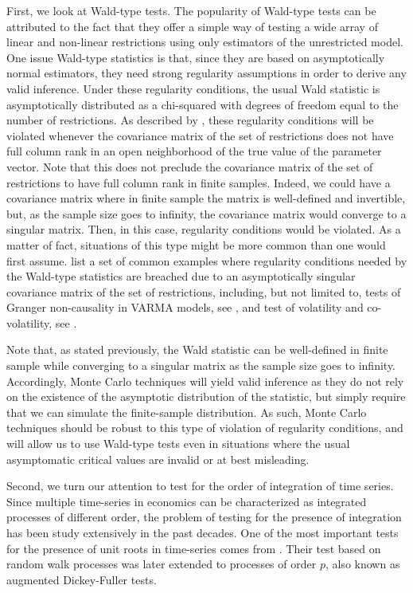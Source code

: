 \documentclass[]{article}\usepackage[]{graphicx}\usepackage[]{color}
\begin{document}
First, we look at Wald-type tests. The popularity of Wald-type tests can be attributed to the fact that they offer a simple way of testing a wide array of linear and non-linear restrictions using only estimators of the unrestricted model. One issue Wald-type statistics is that, since they are based on asymptotically normal estimators, they need strong regularity assumptions in order to derive any valid inference. Under these regularity conditions, the usual Wald statistic is asymptotically distributed as a chi-squared with degrees of freedom equal to the number of restrictions. As described by \cite{dufour_wald_2013}, these regularity conditions will be violated whenever the covariance matrix of the set of restrictions does not have full column rank in an open neighborhood of the true value of the parameter vector. Note that this does not preclude the  covariance matrix of the set of restrictions to have full column rank in finite samples. Indeed, we could have a covariance matrix where in finite sample the matrix is well-defined and invertible, but, as the sample size goes to infinity, the covariance matrix would converge to a singular matrix. Then, in this case, regularity conditions would be violated. As a matter of fact, situations of this type might be more common than one would first assume. \cite{dufour_wald_2013} list a set of common examples where regularity conditions needed by the Wald-type statistics are breached due to an asymptotically singular covariance matrix of the set of restrictions, including, but not limited to, tests of Granger non-causality in VARMA models, see \cite{boudjellaba_testing_1992, boudjellaba_simplified_1992}, and test of volatility and co-volatility, see \cite{gourieroux_size_2013}.

Note that, as stated previously, the Wald statistic can be well-defined in finite sample while converging to a singular matrix as the sample size goes to infinity. Accordingly, Monte Carlo techniques will yield valid inference as they do not rely on the existence of the asymptotic distribution of the statistic, but simply require that we can simulate the finite-sample distribution. As such, Monte Carlo techniques should be robust to this type of violation of regularity conditions, and will allow us to use Wald-type tests even in situations where the usual asymptomatic critical values are invalid or at best misleading.

Second, we turn our attention to test for the order of integration of time series. Since multiple time-series in economics can be characterized as integrated processes of different order, the problem of testing for the presence of integration has been study extensively in the past decades. One of the most important tests for the presence of unit roots in time-series comes from \cite{dickey_distribution_1979,fuller_introduction_1976}. Their test based on random walk processes was later extended to processes of order $p$, also known as augmented Dickey-Fuller tests.
\end{document}
